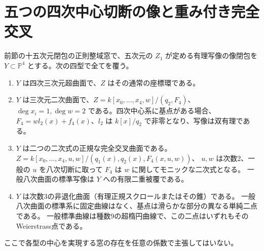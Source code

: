 \section{五つの四次中心切断の像と重み付き完全交叉}
\label{sec:quartic-center-image-atlas}
\begin{theorem}\label{thm:quartic-center-image-atlas}
前節の十五次元閉包の正則整域窓で、五次元の $Z_1$ が定める有理写像の像閉包を
$Y\subset\mathbb P^4$ とする。次の四型で全てを覆う。
\begin{enumerate}
\item $Y$ は四次三次元超曲面で、$Z$ はその通常の座標環である。
\item $Y$ は三次元二次曲面で、$Z=k[x_0,\ldots,x_4,w]/(q_2,F_4)$、
$\deg x_i=1,\deg w=2$ である。四次中心系に基点がある場合、
$F_4=w l_2(x)+f_4(x)$、$l_2$ は $k[x]/q_2$ で非零となり、写像は双有理である。
\item $Y$ は二つの二次式の正規な完全交叉曲面である。
$Z=k[x_0,\ldots,x_4,u,w]/(q_1(x),q_2(x),F_4(x,u,w))$、
$u,w$ は次数2、一般の $u$ を八次切断に取って $F_4$ は $w$ に関してモニックな二次式となる。
一般八次曲面の標準写像は $Y$ への有限二重被覆である。
\item $Y$ は次数3の非退化曲面（有理正規スクロールまたはその錐）である。
一般八次曲面の標準系に固定曲線はなく、基点は滑らかな部分の異なる単純二点である。
一般標準曲線は種数9の超楕円曲線で、この二点はいずれもそのWeierstrass点である。
\end{enumerate}
ここで各型の中心を実現する窓の存在を任意の係数で主張してはいない。
\end{theorem}
